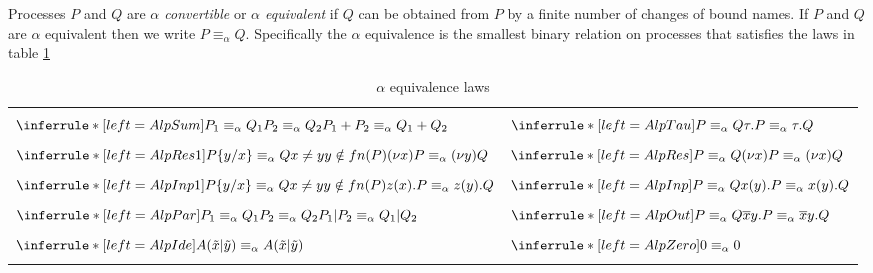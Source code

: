 \begin{definition}
  Processes $P$ and $Q$ are \emph{$\alpha$ convertible} or \emph{$\alpha$ equivalent} if $Q$ can be obtained from $P$ by a finite number of changes of bound names. If $P$ and $Q$ are $\alpha$ equivalent then we write $P\equiv_{\alpha}Q$. Specifically the $\alpha$ equivalence is the smallest binary relation on processes that satisfies the laws in table \ref{alphaequivalence}
  \begin{table}
    \begin{tabular}{ll}
      \hline\\
	  $\inferrule*[left=AlpSum]{
	      P_{1}\equiv_{\alpha}Q_{1}
	    \\
	      P_{2}\equiv_{\alpha}Q_{2}
	  }{
	    P_{1}+P_{2}\equiv_{\alpha}Q_{1}+Q_{2}
	  }$
	&
	  $\inferrule*[left=AlpTau]{
	      P\equiv_{\alpha}Q
	  }{
	    \tau.P\equiv_{\alpha}\tau.Q
	  }$
      \\\\
	  $\inferrule*[left=AlpRes1]{
	      P\{y/x\}\equiv_{\alpha}Q
	    \\
	      x\neq y
	    \\
	      y\notin fn(P)
	  }{
	    (\nu x)P\equiv_{\alpha}(\nu y)Q
	  }$
	&
	  $\inferrule*[left=AlpRes]{
	      P\equiv_{\alpha}Q
	  }{
	    (\nu x)P\equiv_{\alpha}(\nu x)Q
	  }$
      \\\\
	  $\inferrule*[left=AlpInp1]{
	      P\{y/x\}\equiv_{\alpha}Q
	    \\
	      x\neq y
	    \\
	      y\notin fn(P)
	  }{
	    z(x).P\equiv_{\alpha}z(y).Q
	  }$
	&
	  $\inferrule*[left=AlpInp]{
	      P\equiv_{\alpha}Q
	  }{
	    x(y).P\equiv_{\alpha}x(y).Q
	  }$
    \\\\
	  $\inferrule*[left=AlpPar]{
	      P_{1}\equiv_{\alpha}Q_{1}
	    \\
	      P_{2}\equiv_{\alpha}Q_{2}
	  }{
	    P_{1}|P_{2}\equiv_{\alpha}Q_{1}|Q_{2}
	  }$
      &
	  $\inferrule*[left=AlpOut]{
	      P\equiv_{\alpha}Q
	  }{
	    \overline{x}y.P\equiv_{\alpha}\overline{x}y.Q
	  }$
    \\\\
	  $\inferrule*[left=AlpIde]{
	  }{
	    A(\tilde{x}|\tilde{y})\equiv_{\alpha}A(\tilde{x}|\tilde{y})
	  }$
	&
	  $\inferrule*[left=AlpZero]{
	  }{
	    0\equiv_{\alpha}0
	  }$
      \\\\\hline
    \end{tabular}
    \caption{$\alpha$ equivalence laws}
    \label{alphaequivalence}
  \end{table}
\end{definition}


